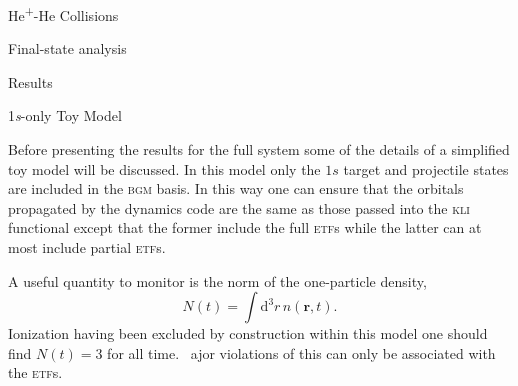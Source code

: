 \documentclass[letterpaper, 11 pt]{report}
\begin{document}
\begin{chapter}{\texorpdfstring{He\textsuperscript{+}}{He+}-He Collisions \label{chap:hephe}}
\begin{section}{Final-state analysis \label{sec:hephe-det}}
   \end{section}

   \begin{section}{Results \label{sec:hephe-disc}}

      \begin{subsection}{1\textit{s}-only Toy Model \label{sec:toy}}

         Before presenting the results for the full system some of the details of a simplified toy model
         will be discussed. In this model only the $1s$ target and projectile states are included in
         the \textsc{bgm} basis. In this way one can ensure that the orbitals propagated by the dynamics
         code are the same as those passed into the \textsc{kli} functional except that the former
         include the full \textsc{etf}s while the latter can at most include partial \textsc{etf}s.

         A useful quantity to monitor is the norm of the one-particle density,
         \begin{equation}
            N(t) = \int \mathrm{d}^3 r \, n(\mathbf{r},t).
         \end{equation}
         Ionization having been excluded by construction within this model one should find $N(t) = 3$
         for all time. ~ajor violations of this can only be associated with the \textsc{etf}s.


\end{subsection}
\end{section}
\end{chapter}
\end{document}
